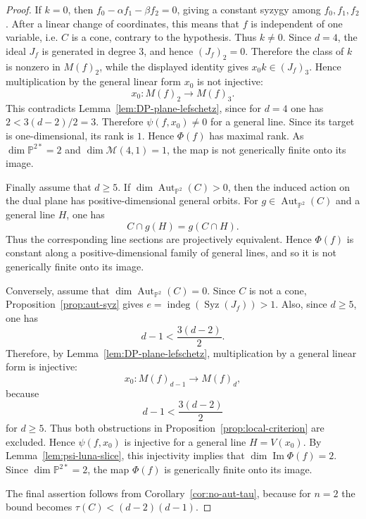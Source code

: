 \documentclass[11pt]{amsart}
\theoremstyle{plain}
\theoremstyle{definition}
\numberwithin{equation}{section}
\newcommand{\M}{{\mathcal M}}
\newcommand{\PP}{\mathbb{P}}
\DeclareMathOperator{\Aut}{Aut}
\begin{document}
\begin{proof}
If $k=0$, then $f_0-\alpha f_1-\beta f_2=0$, giving a constant syzygy among
$f_0,f_1,f_2$. After a linear change of coordinates, this means that $f$ is
independent of one variable, i.e. $C$ is a cone, contrary to the hypothesis.
Thus $k\neq0$. Since $d=4$, the ideal $J_f$ is generated in degree $3$, and hence
$(J_f)_2=0$. Therefore the class of $k$ is nonzero in $M(f)_2$, while the
displayed identity gives $x_0k\in (J_f)_3$. Hence multiplication by the general
linear form $x_0$ is not injective:
\[
x_0:M(f)_2\to M(f)_3.
\]
This contradicts Lemma~\ref{lem:DP-plane-lefschetz}, since for $d=4$ one has $2<3(d-2)/2=3$. Therefore
$\psi(f,x_0)\neq0$ for a general line. Since its target is one-dimensional, its
rank is $1$. Hence $\Phi(f)$ has maximal rank. As
$\dim\PP^{2*}=2$ and $\dim\M(4,1)=1$, the map is not generically finite onto its
image.

Finally assume that $d\geq5$. If $\dim\Aut_{\PP^2}(C)>0$, then the induced
action on the dual plane has positive-dimensional general orbits. For
$g\in\Aut_{\PP^2}(C)$ and a general line $H$, one has
\[
C\cap g(H)=g(C\cap H).
\]
Thus the corresponding line sections are projectively equivalent. Hence
$\Phi(f)$ is constant along a positive-dimensional family of general lines, and
so it is not generically finite onto its image.

Conversely, assume that $\dim\Aut_{\PP^2}(C)=0$. Since $C$ is not a cone,
Proposition~\ref{prop:aut-syz} gives
$e=\operatorname{indeg}(\operatorname{Syz}(J_f))>1$. Also, since $d\geq5$, one
has
\[
d-1<\frac{3(d-2)}2.
\]
Therefore, by Lemma~\ref{lem:DP-plane-lefschetz}, multiplication by a general
linear form is injective:
\[
x_0:M(f)_{d-1}\to M(f)_d,
\]
because
\[
d-1<\frac{3(d-2)}2
\]
for $d\geq5$.
Thus both obstructions in Proposition~\ref{prop:local-criterion} are excluded.
Hence $\psi(f,x_0)$ is injective for a general line $H=V(x_0)$. By Lemma~\ref{lem:psi-luna-slice}, this injectivity implies that 
$\dim\operatorname{Im}\Phi(f)=2$. Since $\dim\PP^{2*}=2$, the map $\Phi(f)$
is generically finite onto its image.

The final assertion follows from Corollary~\ref{cor:no-aut-tau}, because for
$n=2$ the bound becomes $\tau(C)<(d-2)(d-1)$.
\end{proof}
\end{document}
